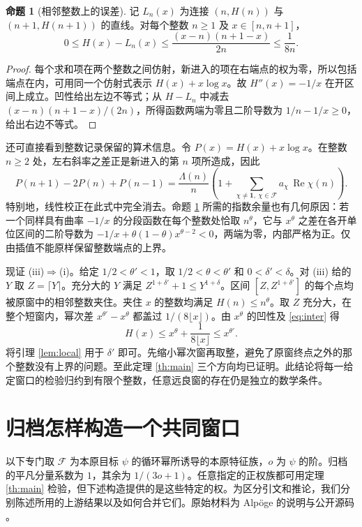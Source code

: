 \documentclass[UTF8,fontset=none,a4paper,11pt]{ctexart}
\theoremstyle{definition}
\newtheorem{prop}[thm]{命题}
\newcommand{\re}{\operatorname{Re}}\newcommand{\e}{\varepsilon}
\newcommand{\F}{\mathcal F}\newcommand{\Res}{\operatorname{Res}}
\begin{document}
\begin{prop}[相邻整数上的误差]\label{prop:integer}
记 $L_n(x)$ 为连接 $(n,H(n))$ 与 $(n+1,H(n+1))$ 的直线。对每个整数 $n\ge1$ 及 $x\in[n,n+1]$，
\begin{equation}
 0\le H(x)-L_n(x)\le\frac{(x-n)(n+1-x)}{2n}\le\frac1{8n}. \label{eq:inter}
\end{equation}
\end{prop}
\begin{proof}
每个求和项在两个整数之间仿射，新进入的项在右端点的权为零，所以包括端点在内，可用同一个仿射式表示 $H(x)+x\log x$。故 $H''(x)=-1/x$ 在开区间上成立。凹性给出左边不等式；从 $H-L_n$ 中减去 $(x-n)(n+1-x)/(2n)$，所得函数两端为零且二阶导数为 $1/n-1/x\ge0$，给出右边不等式。
\end{proof}
还可直接看到整数记录保留的算术信息。令 $P(x)=H(x)+x\log x$。在整数 $n\ge2$ 处，左右斜率之差正是新进入的第 $n$ 项所造成，因此
\[
 P(n+1)-2P(n)+P(n-1)
   =\frac{\Lambda(n)}{n}\left(1+\sum_{\chi\ne\mathbf1,\ \chi\in\F}
                                  a_\chi\,\re\chi(n)\right).
\]
特别地，线性校正在此式中完全消去。命题 \ref{prop:integer} 所需的指数余量也有几何原因：若一个同样具有曲率 $-1/x$ 的分段函数在每个整数处恰取 $n^\theta$，它与 $x^\theta$ 之差在各开单位区间的二阶导数为 $-1/x+\theta(1-\theta)x^{\theta-2}<0$，两端为零，内部严格为正。仅由插值不能原样保留整数端点的上界。

现证 (iii)$\Rightarrow$(i)。给定 $1/2<\theta'<1$，取 $1/2<\theta<\theta'$ 和 $0<\delta'<\delta$。对 (iii) 给的 $Y$ 取 $Z=\lceil Y\rceil$。充分大的 $Y$ 满足 $Z^{1+\delta'}+1\le Y^{1+\delta}$。区间 $[Z,Z^{1+\delta'}]$ 的每个点均被原窗中的相邻整数夹住。夹住 $x$ 的整数均满足 $H(n)\le n^\theta$。取 $Z$ 充分大，在整个短窗内，幂次差 $x^{\theta'}-x^\theta$ 都盖过 $1/(8\lfloor x\rfloor)$。由 $x^\theta$ 的凹性及 \eqref{eq:inter} 得
\[
 H(x)\le x^\theta+\frac1{8\lfloor x\rfloor}\le x^{\theta'} .
\]
将引理 \ref{lem:local} 用于 $\delta'$ 即可。先缩小幂次窗再取整，避免了原窗终点之外的那个整数没有上界的问题。至此定理 \ref{th:main} 三个方向均已证明。此结论将每一给定窗口的检验归约到有限个整数，任意远良窗的存在仍是独立的数学条件。

\section{归档怎样构造一个共同窗口}\label{sec:ar}
以下专门取 $\F$ 为本原目标 $\psi$ 的循环幂所诱导的本原特征族，$o$ 为 $\psi$ 的阶。归档的平凡分量系数为 $1$，其余为 $1/(3o+1)$。任意指定的正权族都可用定理 \ref{th:main} 检验，但下述构造提供的是这些特定的权。为区分引文和推论，我们分别陈述所用的上游结果以及如何合并它们。原始材料为 Alpöge 的说明与公开源码 \cite{al,archive}。
\end{document}
